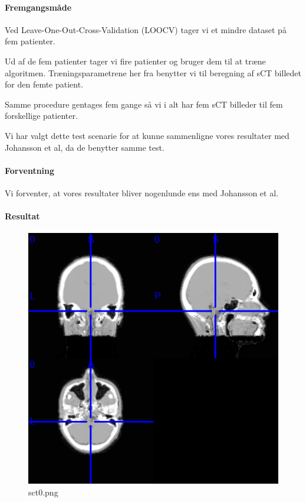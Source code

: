 \paragraph{Fremgangsmåde}
Ved Leave-One-Out-Cross-Validation (LOOCV) tager vi et mindre dataset på fem patienter.

Ud af de fem patienter tager vi fire patienter og bruger dem til at træne algoritmen. Træningsparametrene her fra benytter vi til beregning af sCT billedet for den femte patient.

Samme procedure gentages fem gange så vi i alt har fem sCT billeder til fem forskellige patienter.

Vi har valgt dette test scenarie for at kunne sammenligne vores resultater med Johansson et al, da de benytter samme test.


\paragraph{Forventning}
Vi forventer, at vores resultater bliver nogenlunde ens med Johansson et al.

\paragraph{Resultat}

\begin{figure}
\includegraphics[width=\linewidth]{sct0.png}
\caption{sct0.png}
\end{figure}

